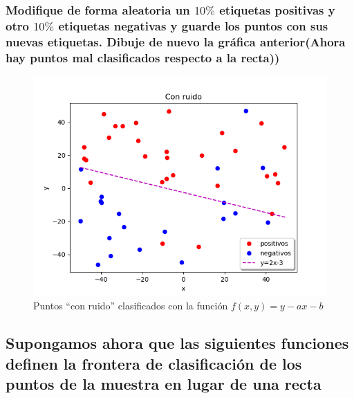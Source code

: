 \documentclass[12pt,a4paper]{article}
\begin{document}
\subsubsection{Modifique de forma aleatoria un $10\%$ etiquetas positivas y otro $10\%$ etiquetas negativas y guarde los puntos con sus nuevas etiquetas. Dibuje de nuevo la gráfica anterior(Ahora hay puntos mal clasificados respecto a la recta))}
	
\begin{figure}[H]  %
	\centering
	\includegraphics{images/ejercicio2Conruido.png}  
	\caption{Puntos ``con ruido'' clasificados con la función $f(x,y)=y-ax-b$}
	\label{figura4}
\end{figure}

\subsection{Supongamos ahora que las siguientes funciones definen la frontera de clasificación de los puntos de la muestra en lugar de una recta}
\end{document}
